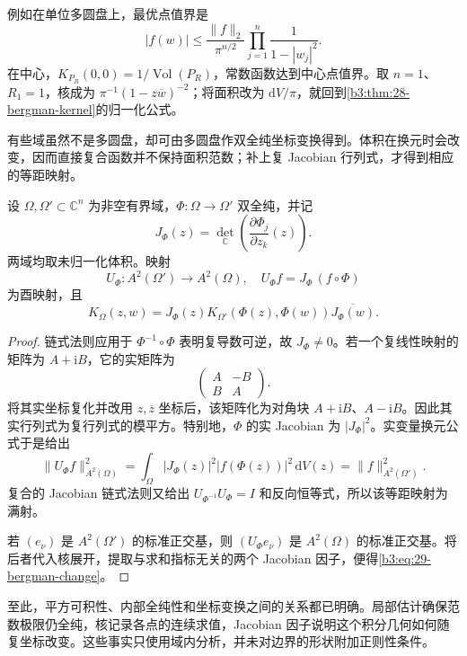 例如在单位多圆盘上，最优点值界是
\[
 |f(w)|\le\frac{\|f\|_2}{\pi^{n/2}}
             \prod_{j=1}^n\frac1{1-|w_j|^2}.
\]
在中心，\(K_{P_R}(0,0)=1/\operatorname{Vol}(P_R)\)，常数函数达到中心点值界。取 \(n=1\)、\(R_1=1\)，核成为 \(\pi^{-1}(1-z\overline w)^{-2}\)；将面积改为 \(\mathrm{d}V/\pi\)，就回到\cref{b3:thm:28-bergman-kernel}的归一化公式。

\ProseParagraphBreak

有些域虽然不是多圆盘，却可由多圆盘作双全纯坐标变换得到。体积在换元时会改变，因而直接复合函数并不保持面积范数；补上复 Jacobian 行列式，才得到相应的等距映射。

\begin{proposition}\label{b3:prop:29-bergman-biholomorphic}
设 \(\Omega,\Omega'\subset\mathbb C^n\) 为非空有界域，\(\Phi:\Omega\to\Omega'\) 双全纯，并记
\[
 J_\Phi(z)=\det_{\mathbb C}\left(\frac{\partial\Phi_j}{\partial z_k}(z)\right).
\]
两域均取未归一化体积。映射
\[
 U_\Phi:A^2(\Omega')\longrightarrow A^2(\Omega),
 \quad U_\Phi f=J_\Phi\,(f\circ\Phi)
\]
为酉映射，且
\begin{equation}\label{b3:eq:29-bergman-change}
 K_\Omega(z,w)=J_\Phi(z)
 K_{\Omega'}(\Phi(z),\Phi(w))\overline{J_\Phi(w)}.
\end{equation}
\end{proposition}
\begin{proof}
链式法则应用于 \(\Phi^{-1}\circ\Phi\) 表明复导数可逆，故 \(J_\Phi\ne0\)。若一个复线性映射的矩阵为 \(A+\mathrm{i}B\)，它的实矩阵为
\[
 \begin{pmatrix}A&-B\\ B&A\end{pmatrix}.
\]
将其实坐标复化并改用 \(z,\overline z\) 坐标后，该矩阵化为对角块 \(A+\mathrm{i}B\)、\(A-\mathrm{i}B\)。因此其实行列式为复行列式的模平方。特别地，\(\Phi\) 的实 Jacobian 为 \(|J_\Phi|^2\)。实变量换元公式于是给出
\[
 \|U_\Phi f\|_{A^2(\Omega)}^2
 =\int_\Omega|J_\Phi(z)|^2|f(\Phi(z))|^2\,\mathrm{d}V(z)
 =\|f\|_{A^2(\Omega')}^2.
\]
复合的 Jacobian 链式法则又给出 \(U_{\Phi^{-1}}U_\Phi=I\) 和反向恒等式，所以该等距映射为满射。

若 \((e_\nu)\) 是 \(A^2(\Omega')\) 的标准正交基，则 \((U_\Phi e_\nu)\) 是 \(A^2(\Omega)\) 的标准正交基。将后者代入核展开，提取与求和指标无关的两个 Jacobian 因子，便得\eqref{b3:eq:29-bergman-change}。
\end{proof}

至此，平方可积性、内部全纯性和坐标变换之间的关系都已明确。局部估计确保范数极限仍全纯，核记录各点的连续求值，Jacobian 因子说明这个积分几何如何随复坐标改变。这些事实只使用域内分析，并未对边界的形状附加正则性条件。

